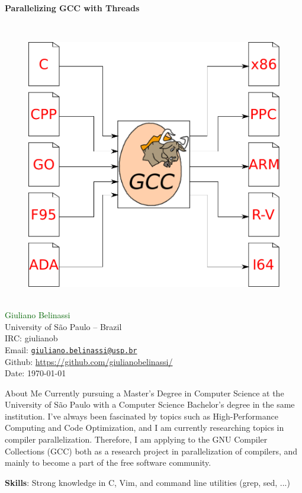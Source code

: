 \documentclass[12pt]{article}
\begin{document}
\newtheorem{theorem}{Teorema}%
\newtheorem{corollary}{Corolário}[theorem]
\newtheorem{lemma}[theorem]{Lema}

\begin{center}
\Huge \bf
Parallelizing GCC with Threads
\vspace{0.5cm}
\end{center}
\tiny{\ }
\begin{figure}[ht]
     \centering
     \includegraphics[scale=1.]{logo.pdf}
     \label{fig:logo}
\end{figure}
\vspace*{\fill} \\
\normalsize{
\textcolor{darkgreen}{Giuliano Belinassi} \\
University of São Paulo -- Brazil \\
IRC: giulianob \\
Email: \href{mailto:giuliano.belinassi@usp.br}{\texttt{giuliano.belinassi@usp.br}} \\
Github: \url{https://github.com/giulianobelinassi/} \\
Date: \today
}
\newpage

\begin{section}{About Me}
    Currently pursuing a Master's Degree in Computer Science at the University
    of São Paulo with a Computer Science Bachelor's degree in the same
    institution. I've always been fascinated by topics such as
    High-Performance Computing and Code Optimization, and I am currently
    researching topics in compiler
    parallelization. Therefore, I am applying to the GNU Compiler Collections
    (GCC) both as a research project in parallelization of compilers, and
    mainly to become a part of the free software community.

    \textbf{Skills}: Strong knowledge in C, Vim, and command line utilities (grep, sed, ...)
\end{section}
\end{document}

